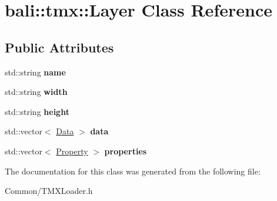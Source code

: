 \hypertarget{classbali_1_1tmx_1_1_layer}{\section{bali\-:\-:tmx\-:\-:Layer Class Reference}
\label{classbali_1_1tmx_1_1_layer}
}
\subsection*{Public Attributes}
\begin{DoxyCompactItemize}
\item 
\hypertarget{classbali_1_1tmx_1_1_layer_a4380cecfe2f65075481e2a9b6180283b}{std\-::string {\bfseries name}}\label{classbali_1_1tmx_1_1_layer_a4380cecfe2f65075481e2a9b6180283b}

\item 
\hypertarget{classbali_1_1tmx_1_1_layer_a6e5051ad209356993913e2d04a3e3e8d}{std\-::string {\bfseries width}}\label{classbali_1_1tmx_1_1_layer_a6e5051ad209356993913e2d04a3e3e8d}

\item 
\hypertarget{classbali_1_1tmx_1_1_layer_aaa2152d3905a3f667c82a9d7a99b3a86}{std\-::string {\bfseries height}}\label{classbali_1_1tmx_1_1_layer_aaa2152d3905a3f667c82a9d7a99b3a86}

\item 
\hypertarget{classbali_1_1tmx_1_1_layer_aee3bbec1f3f23bbabab2d27f89499ce0}{std\-::vector$<$ \hyperlink{classbali_1_1tmx_1_1_data}{Data} $>$ {\bfseries data}}\label{classbali_1_1tmx_1_1_layer_aee3bbec1f3f23bbabab2d27f89499ce0}

\item 
\hypertarget{classbali_1_1tmx_1_1_layer_aa69995601a5004ca5bbf2c0f3951bf51}{std\-::vector$<$ \hyperlink{classbali_1_1tmx_1_1_property}{Property} $>$ {\bfseries properties}}\label{classbali_1_1tmx_1_1_layer_aa69995601a5004ca5bbf2c0f3951bf51}

\end{DoxyCompactItemize}


The documentation for this class was generated from the following file\-:\begin{DoxyCompactItemize}
\item 
Common/T\-M\-X\-Loader.\-h\end{DoxyCompactItemize}
